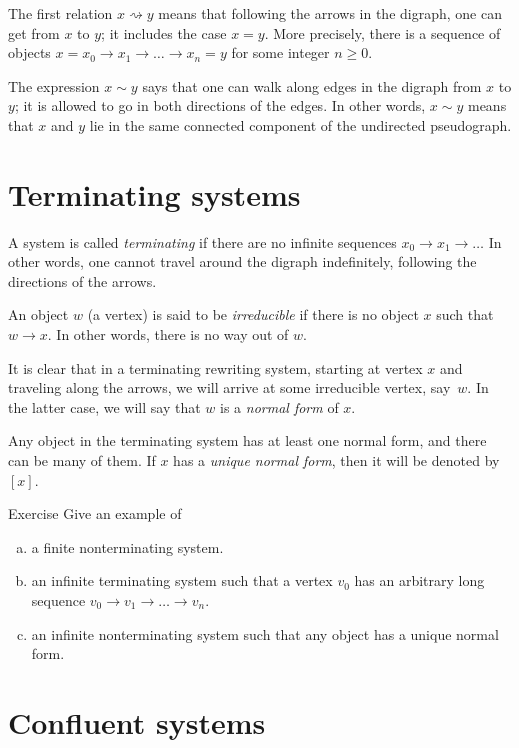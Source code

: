 The first relation $x\rightsquigarrow y$ means that following the arrows in the digraph,
one can get from $x$ to $y$; it includes the case $x=y$.
More precisely, there is a sequence of objects $x=x_0\to x_1\to\dots\to x_n=y$ for some integer $n\ge 0$.

The expression $x \sim y$ says that one can walk along edges in the digraph from $x$ to $y$;
it is allowed to go in both directions of the edges.
In other words, $x \sim y$ means that $x$ and $y$ lie in the same connected component of the undirected pseudograph.

\section{Terminating systems}

A system is called \emph{terminating} if there are no infinite sequences $x_0 \to x_1 \to \dots $
In other words, one cannot travel around the digraph indefinitely, following the directions of the arrows.

An object $w$ (a vertex) is said to be \emph{irreducible} if there is no object $x$ such that $w \to x$.
In other words, there is no way out of $w$.

It is clear that in a terminating rewriting system, starting at vertex $x$ and traveling along the arrows, we will arrive at some irreducible vertex, say~$w$.
In the latter case, we will say that $w$ is a \emph{normal form} of $x$.

Any object in the terminating system has at least one normal form, and there can be many of them.
If $x$ has a {}\emph{unique normal form}, then it will be denoted by $[x]$.



\begin{thm}{Exercise}
Give an example of 
\begin{enumerate}[(a)]
\item a finite nonterminating system.
\item an infinite terminating system such that a vertex $v_0$ has an arbitrary long sequence $v_0 \to v_1 \to \dots \to v_n$.
\item an infinite nonterminating  system such that any object has a unique normal form.
\end{enumerate}

\end{thm}

\section{Confluent systems}

